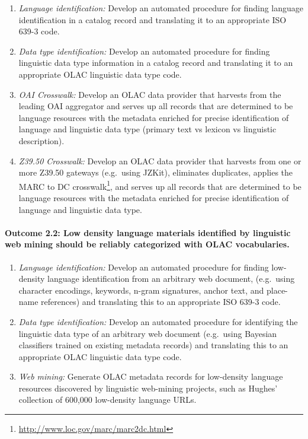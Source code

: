 \begin{enumerate}[label=\emph{\task\alph*}]\setlength{\itemsep}{0pt}
\item \emph{Language identification:}
  Develop an automated procedure for finding
  language identification in a catalog record and translating it to an
  appropriate ISO 639-3 code.
\item \emph{Data type identification:}
  Develop an automated procedure for finding
  linguistic data type information in a catalog record and translating
  it to an appropriate OLAC linguistic data type code.
\item \emph{OAI Crosswalk:}
  Develop an OLAC data provider that harvests from the
  leading OAI aggregator and serves up all records that are determined to
  be language resources with the metadata enriched for precise
  identification of language and linguistic data type (primary text vs
  lexicon vs linguistic description).
\item \emph{Z39.50 Crosswalk:}
  Develop an OLAC data provider that harvests from one or more
  Z39.50 gateways (e.g.~using JZKit), eliminates duplicates,
  applies the MARC to DC crosswalk\footnote{\scriptsize\url{http://www.loc.gov/marc/marc2dc.html}},
  and serves up all records that are determined to
  be language resources with the metadata enriched for precise
  identification of language and linguistic data type.
\end{enumerate}


\def\task{2.2}
\paragraph{Outcome {\task}: Low density language materials identified by
  linguistic web mining should be reliably categorized with OLAC vocabularies.}

\begin{enumerate}[label=\emph{\task\alph*}]\setlength{\itemsep}{0pt}
\item \emph{Language identification:}
  Develop an automated procedure for finding
  low-density language identification from an arbitrary web document,
  (e.g.~using character encodings, keywords,
  n-gram signatures, anchor text, and place-name references)
  and translating this to an appropriate ISO 639-3 code.
\item \emph{Data type identification:}
  Develop an automated procedure for identifying
  the linguistic data type of an arbitrary web document
  (e.g.~using Bayesian classifiers trained on existing metadata records)
  and translating this to an appropriate OLAC linguistic data type code.
\item \emph{Web mining:}
  Generate OLAC metadata records for low-density
  language resources discovered by linguistic web-mining projects,
  such as Hughes' collection of 600,000 low-density language URLs.
\end{enumerate}

